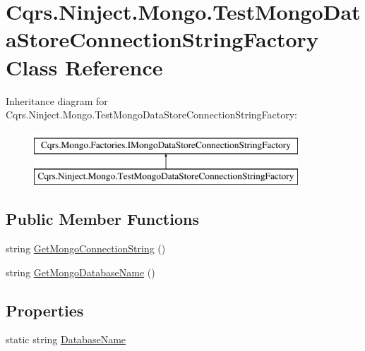 \hypertarget{classCqrs_1_1Ninject_1_1Mongo_1_1TestMongoDataStoreConnectionStringFactory}{}\section{Cqrs.\+Ninject.\+Mongo.\+Test\+Mongo\+Data\+Store\+Connection\+String\+Factory Class Reference}
\label{classCqrs_1_1Ninject_1_1Mongo_1_1TestMongoDataStoreConnectionStringFactory}
Inheritance diagram for Cqrs.\+Ninject.\+Mongo.\+Test\+Mongo\+Data\+Store\+Connection\+String\+Factory\+:\begin{figure}[H]
\begin{center}
\leavevmode
\includegraphics[height=2.000000cm]{classCqrs_1_1Ninject_1_1Mongo_1_1TestMongoDataStoreConnectionStringFactory}
\end{center}
\end{figure}
\subsection*{Public Member Functions}
\begin{DoxyCompactItemize}
\item 
string \hyperlink{classCqrs_1_1Ninject_1_1Mongo_1_1TestMongoDataStoreConnectionStringFactory_ae23b67139698984823fa7c250dcca47a_ae23b67139698984823fa7c250dcca47a}{Get\+Mongo\+Connection\+String} ()
\item 
string \hyperlink{classCqrs_1_1Ninject_1_1Mongo_1_1TestMongoDataStoreConnectionStringFactory_ac638a5771711c1d0746ee0ec55c5e192_ac638a5771711c1d0746ee0ec55c5e192}{Get\+Mongo\+Database\+Name} ()
\end{DoxyCompactItemize}
\subsection*{Properties}
\begin{DoxyCompactItemize}
\item 
static string \hyperlink{classCqrs_1_1Ninject_1_1Mongo_1_1TestMongoDataStoreConnectionStringFactory_a911d570725e6702a9c1d16321202d89f_a911d570725e6702a9c1d16321202d89f}{Database\+Name}
\end{DoxyCompactItemize}


